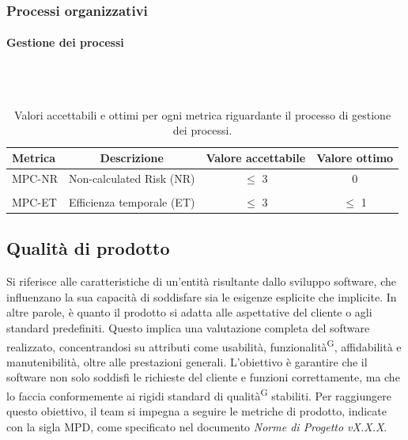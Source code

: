 \documentclass[8pt]{article}
\newcommand{\glossterm}[1]{#1\textsuperscript{G}} %
\newcommand{\subsubsubsection}[1]{\paragraph{#1}\mbox{}\\\\}
\begin{document}
\subsubsection{Processi organizzativi}
\subsubsubsection{Gestione dei processi}
\begin{table}[H]	
	\centering
	\begin{tabular}{lccc}
		\toprule
		\textbf{Metrica}& \textbf{Descrizione} & \textbf{Valore accettabile} & \textbf{Valore ottimo} \\
		\midrule
		MPC-NR & Non-calculated Risk (NR) & $\leq$ 3 & 0\\\\
		MPC-ET & Efficienza temporale (ET) & $\leq$ 3 & $\leq$ 1 \\
		\bottomrule
	\end{tabular}
	\caption{Valori accettabili e ottimi per ogni metrica riguardante il processo di gestione dei processi.}
	\label{table:Valori accettabili e ottimi per ogni metrica riguardante il processo di gestione dei processi.}
\end{table}
\subsection{Qualità di prodotto}
Si riferisce alle caratteristiche di un'entità risultante dallo sviluppo software, che influenzano la sua capacità di soddisfare sia le esigenze esplicite che implicite. In altre parole, è quanto il prodotto si adatta alle aspettative del cliente o agli standard predefiniti. Questo implica una valutazione completa del software realizzato, concentrandosi su attributi come usabilità, \glossterm{funzionalità}, affidabilità e manutenibilità, oltre alle prestazioni generali. L'obiettivo è garantire che il software non solo soddisfi le richieste del cliente e funzioni correttamente, ma che lo faccia conformemente ai rigidi standard di \glossterm{qualità} stabiliti. Per raggiungere questo obiettivo, il team si impegna a seguire le metriche di prodotto, indicate con la sigla MPD, come specificato nel documento \textit{Norme di Progetto vX.X.X}.
\end{document}
